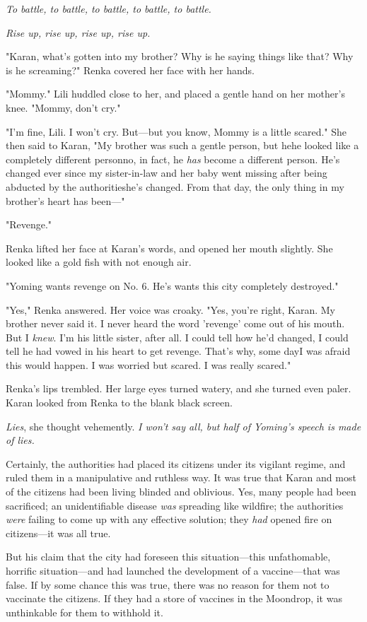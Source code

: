 \emph{To battle, to battle, to battle, to battle, to battle.}

\emph{Rise up, rise up, rise up, rise up.}

"Karan, what's gotten into my brother? Why is he saying things like
that? Why is he screaming?" Renka covered her face with her hands.

"Mommy." Lili huddled close to her, and placed a gentle hand on her
mother's knee. "Mommy, don't cry."

"I'm fine, Lili. I won't cry. But---but you know, Mommy is a little
scared." She then said to Karan, "My brother was such a gentle person,
but he\el he looked like a completely different person\el no, in fact,
he \emph{has} become a different person. He's changed ever since my
sister-in-law and her baby went missing after being abducted by the
authorities\el he's changed. From that day, the only thing in my
brother's heart has been---"

"Revenge."

Renka lifted her face at Karan's words, and opened her mouth slightly.
She looked like a gold fish with not enough air.

"Yoming wants revenge on No. 6. He's wants this city completely
destroyed."

"Yes," Renka answered. Her voice was croaky. "Yes, you're right, Karan.
My brother never said it. I never heard the word 'revenge' come out of
his mouth. But I \emph{knew}. I'm his little sister, after all. I could tell
how he'd changed, I could tell he had vowed in his heart to get revenge.
That's why, some day\el I was afraid this would happen. I was worried\el 
but scared. I was really scared."

Renka's lips trembled. Her large eyes turned watery, and she turned even
paler. Karan looked from Renka to the blank black screen.

\emph{Lies}, she thought vehemently. \emph{I won't say all, but half of Yoming's
speech is made of lies.}

Certainly, the authorities had placed its citizens under its vigilant
regime, and ruled them in a manipulative and ruthless way. It was true
that Karan and most of the citizens had been living blinded and
oblivious. Yes, many people had been sacrificed; an unidentifiable
disease \emph{was} spreading like wildfire; the authorities \emph{were} failing to
come up with any effective solution; they \emph{had} opened fire on citizens---it
was all true.

But his claim that the city had foreseen this situation---this
unfathomable, horrific situation---and had launched the development of a
vaccine---that was false. If by some chance this was true, there was no
reason for them not to vaccinate the citizens. If they had a store of
vaccines in the Moondrop, it was unthinkable for them to withhold it.

